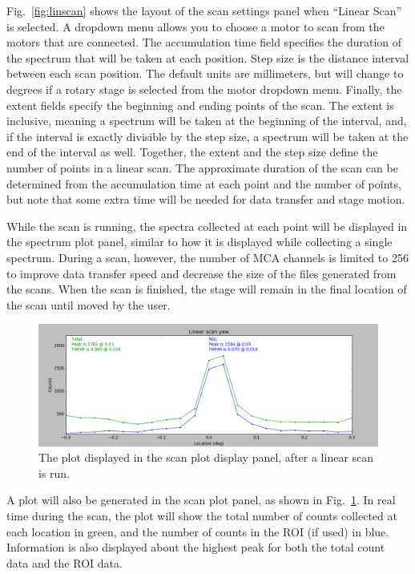 Fig.~\ref{fig:linscan} shows the layout of the scan settings panel when ``Linear
Scan'' is selected. A dropdown menu allows you to choose a motor to scan from
the motors that are connected. The accumulation time field specifies the
duration of the spectrum that will be taken at each position. Step size is the
distance interval between each scan position. The default units are millimeters,
but will change to degrees if a rotary stage is selected from the motor dropdown
menu. Finally, the extent fields specify the beginning and ending points of the
scan. The extent is inclusive, meaning a spectrum will be taken at the beginning
of the interval, and, if the interval is exactly divisible by the step size, a
spectrum will be taken at the end of the interval as well. Together, the extent
and the step size define the number of points in a linear scan. The approximate
duration of the scan can be determined from the accumulation time at each point
and the number of points, but note that some extra time will be needed for data
transfer and stage motion.

While the scan is running, the spectra collected at each point will be displayed
in the spectrum plot panel, similar to how it is displayed while collecting a
single spectrum. During a scan, however, the number of MCA channels is limited
to 256 to improve data transfer speed and decrease the size of the files
generated from the scans. When the scan is finished, the stage will remain in
the final location of the scan until moved by the user.

\begin{figure}
\centering \includegraphics[width=\textwidth]{linplot.png}
\caption{\label{fig:linplot} The plot displayed in the scan plot display panel,
  after a linear scan is run.}
\end{figure}

A plot will also be generated in the scan plot panel, as shown in
Fig.~\ref{fig:linplot}. In real time during the scan, the plot will show the
total number of counts collected at each location in green, and the number of
counts in the ROI (if used) in blue. Information is also displayed about the
highest peak for both the total count data and the ROI data.

